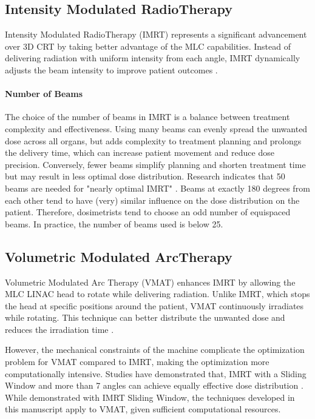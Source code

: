 \subsection[IMRT]{Intensity Modulated RadioTherapy}
Intensity Modulated RadioTherapy (IMRT) represents a significant advancement over 3D CRT by taking better advantage of the  MLC capabilities.
Instead of delivering radiation with uniform intensity from each angle, IMRT dynamically adjusts the beam intensity to improve patient outcomes \cite{Tubiana2000}.

\paragraph{Number of Beams}
The choice of the number of beams in IMRT is a balance between treatment complexity and effectiveness.
Using many beams can evenly spread the unwanted dose across all organs, but adds complexity to treatment planning and prolongs the delivery time, which can increase patient movement and reduce dose precision.
Conversely, fewer beams simplify planning and shorten treatment time but may result in less optimal dose distribution.
Research indicates that 50 beams are needed for "nearly optimal IMRT" \cite{Fenwick2011}.
Beams at exactly 180 degrees from each other tend to have (very) similar influence on the dose distribution on the patient.
Therefore, dosimetrists tend to choose an odd number of equispaced beams.
In practice, the number of beams used is below 25.


\subsection[VMAT]{Volumetric Modulated ArcTherapy}
Volumetric Modulated Arc Therapy (VMAT) enhances IMRT by allowing the MLC LINAC head to rotate while delivering radiation.
Unlike IMRT, which stops the head at specific positions around the patient, VMAT continuously irradiates while rotating.
This technique can better distribute the unwanted dose and reduces the irradiation time \cite{Hardcastle2011}.


However, the mechanical constraints of the machine complicate the optimization problem for VMAT compared to IMRT, making the optimization more computationally intensive.
Studies have demonstrated that, IMRT with a Sliding Window and more than 7 angles can achieve equally effective dose distribution \cite{Bortfeld2010} \cite{Quan2012}.
While demonstrated with IMRT Sliding Window, the techniques developed in this manuscript apply to VMAT, given sufficient computational resources.



